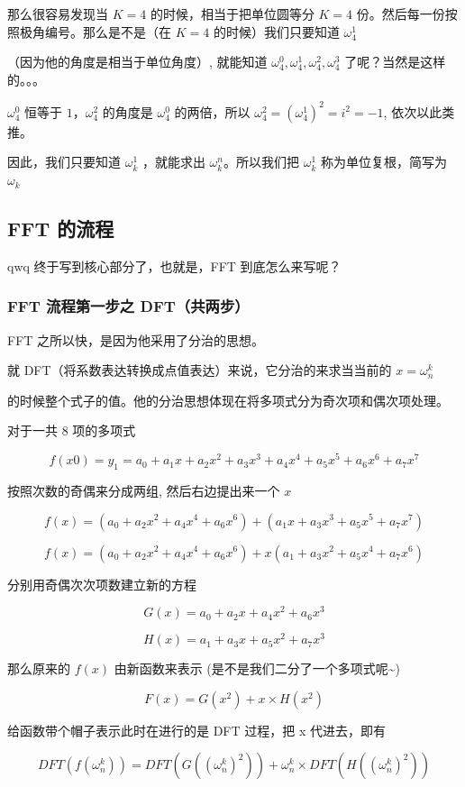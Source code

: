 那么很容易发现当 $K = 4$ 的时候，相当于把单位圆等分 $K= 4$ 份。然后每一份按照极角编号。那么是不是（在 $K = 4$ 的时候）我们只要知道 $\omega_4^1$

（因为他的角度是相当于单位角度）, 就能知道 $\omega_4^0, \omega_4^1, \omega_4^2, \omega_4^3$ 了呢？当然是这样的。。。

$\omega_4^0$ 恒等于 $1$，$\omega_4^2$ 的角度是 $\omega_4^0$ 的两倍，所以 $\omega_4^2 = (\omega_4^1)^2 = i^2=-1$, 依次以此类推。

因此，我们只要知道 $\omega_k^1$ ，就能求出 $\omega_k^n$。所以我们把 $\omega_k^1$ 称为单位复根，简写为 $\omega_k$

\subsection{FFT 的流程}

qwq 终于写到核心部分了，也就是，FFT 到底怎么来写呢？

\subsubsection{FFT 流程第一步之 DFT（共两步）}

FFT 之所以快，是因为他采用了分治的思想。

就 DFT（将系数表达转换成点值表达）来说，它分治的来求当当前的 $x=\omega_n^k$

的时候整个式子的值。他的分治思想体现在将多项式分为奇次项和偶次项处理。

对于一共 $8$ 项的多项式

$$
f(x0) = y_1 = a_0 + a_1x + a_2x^2+a_3x^3+a_4x^4+a_5x^5+a_6x^6+a_7x^7
$$

按照次数的奇偶来分成两组, 然后右边提出来一个 $x$

$$
f(x) = (a_0+a_2x^2+a_4x^4+a_6x^6) + (a_1x+a_3x^3+a_5x^5+a_7x^7)
$$

$$
f(x) = (a_0+a_2x^2+a_4x^4+a_6x^6) + x(a_1+a_3x^2+a_5x^4+a_7x^6)
$$

分别用奇偶次次项数建立新的方程

$$
G(x) = a_0+a_2x+a_4x^2+a_6x^3
$$

$$
H(x)=a_1+a_3x+a_5x^2+a_7x^3
$$

那么原来的 $f(x)$ 由新函数来表示 (是不是我们二分了一个多项式呢\textasciitilde{})

$$
F(x)=G(x^2) + x  \times  H(x^2)
$$

给函数带个帽子表示此时在进行的是 DFT 过程，把 x 代进去，即有

$$
DFT(f(\omega_n^k))=DFT(G((\omega_n^k)^2)) + \omega_n^k  \times  DFT(H((\omega_n^k)^2))
$$

